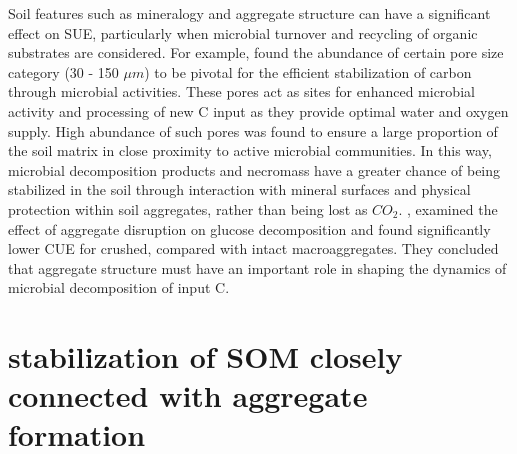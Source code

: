 \documentclass[12pt]{report}
\begin{document}
	Soil features such as mineralogy and aggregate structure can have a significant effect on SUE, particularly when microbial turnover and recycling of organic substrates are considered. For example, \citet{kravchenko2019} found the abundance of certain pore size category (30 - 150 $ \mu m $) to be pivotal for the efficient stabilization of carbon through microbial activities. These pores act as sites for enhanced microbial activity and processing of new C input as they provide optimal water and oxygen supply. High abundance of such pores was found to ensure a large proportion of the soil matrix in close proximity to active microbial communities. In this way, microbial decomposition products and necromass have a greater chance of being stabilized in the soil through interaction with mineral surfaces and physical protection within soil aggregates, rather than being lost as $ CO_2 $.     
	\citet{tian2015}, examined the effect of aggregate disruption on glucose decomposition and found significantly lower CUE for crushed, compared with intact macroaggregates. They concluded that aggregate structure must have an important role in shaping the dynamics of microbial decomposition of input C. 
	
\section{stabilization of SOM closely connected with aggregate formation}
\end{document}
